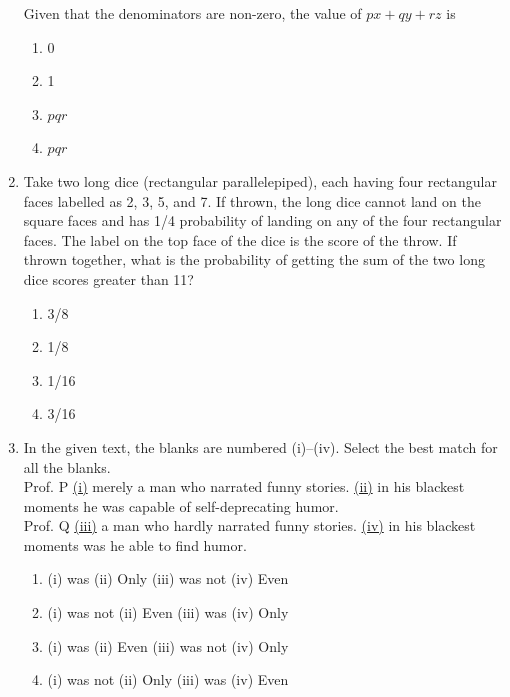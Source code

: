 \documentclass[journal,12pt,onecolumn]{IEEEtran}
\theoremstyle{remark}
\begin{document}
\begin{enumerate}
Given that the denominators are non-zero, the value of $px + qy + rz$ is
\begin{enumerate}
    \item 0
    \item 1
    \item $pqr$
    \item $pqr$
\end{enumerate}

\item Take two long dice (rectangular parallelepiped), each having four rectangular faces labelled as 2, 3, 5, and 7. If thrown, the long dice cannot land on the square faces and has 1/4 probability of landing on any of the four rectangular faces. The label on the top face of the dice is the score of the throw.
If thrown together, what is the probability of getting the sum of the two long dice scores greater than 11?
\begin{enumerate}
    \item 3/8
    \item 1/8
    \item 1/16
    \item 3/16
\end{enumerate}

\item In the given text, the blanks are numbered (i)--(iv). Select the best match for all the blanks.\\
Prof. P \underline{(i)} merely a man who narrated funny stories. \underline{(ii)} in his blackest moments he was capable of self-deprecating humor.\\
Prof. Q \underline{(iii)} a man who hardly narrated funny stories. \underline{(iv)} in his blackest moments was he able to find humor.
\begin{enumerate}
    \item (i) was \hspace{1em} (ii) Only \hspace{1em} (iii) was not \hspace{1em} (iv) Even
    \item (i) was not \hspace{1em} (ii) Even \hspace{1em} (iii) was \hspace{1em} (iv) Only
    \item (i) was \hspace{1em} (ii) Even \hspace{1em} (iii) was not \hspace{1em} (iv) Only
    \item (i) was not \hspace{1em} (ii) Only \hspace{1em} (iii) was \hspace{1em} (iv) Even
\end{enumerate}



\end{enumerate}
\end{document}
